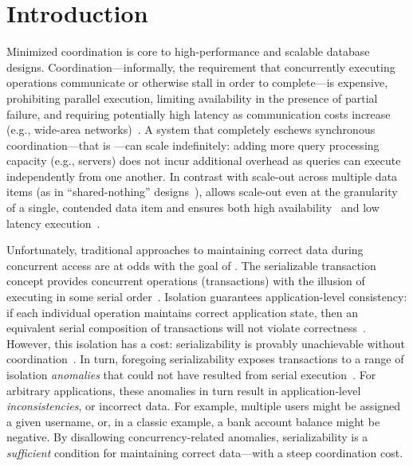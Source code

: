 
\section{Introduction}
\label{sec:intro}


Minimized coordination is core to high-performance and scalable
database designs. Coordination---informally, the requirement that
concurrently executing operations communicate or otherwise stall in
order to complete---is expensive, prohibiting parallel execution,
limiting availability in the presence of partial failure, and
requiring potentially high latency as communication costs increase
(e.g., wide-area networks)~\cite{hat-vldb,gilbert-cap}. A system that
completely eschews synchronous coordination---that is
\textit{\cfree}---can scale indefinitely: adding more query processing
capacity (e.g., servers) does not incur additional overhead as queries
can execute independently from one another. In contrast with scale-out
across multiple data items (as in ``shared-nothing''
designs~\cite{bernstein-book,f1,spanner,pnuts,hstore}), \cfreedom
allows scale-out even at the granularity of a single, contended data
item and ensures both high availability~\cite{gilbert-cap} and low
latency execution~\cite{pacelc}.


Unfortunately, traditional approaches to maintaining correct data
during concurrent access are at odds with the goal of \cfreedom. The
serializable transaction concept provides concurrent operations
(transactions) with the illusion of executing in some serial
order~\cite{bernstein-book}. Isolation guarantees application-level
consistency: if each individual operation maintains correct
application state, then an equivalent serial composition of
transactions will not violate
correctness~\cite{gray-virtues}. However, this isolation has a cost:
serializability is provably unachievable without
coordination~\cite{hat-vldb,davidson-survey}. In turn, foregoing
serializability exposes transactions to a range of isolation
\textit{anomalies} that could not have resulted from serial
execution~\cite{adya-isolation}. For arbitrary applications, these
anomalies in turn result in application-level
\textit{inconsistencies}, or incorrect data. For example, multiple
users might be assigned a given username, or, in a classic example, a
bank account balance might be negative. By disallowing
concurrency-related anomalies, serializability is a
\textit{sufficient} condition for maintaining correct data---with a
steep coordination cost.

